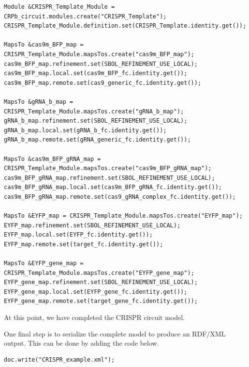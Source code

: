 

\vspace{\abovedisplayskip}
\begin{minipage}{0.95\textwidth}
\begin{lstlisting}
Module &CRISPR_Template_Module = CRPb_circuit.modules.create("CRISPR_Template"); 	
CRISPR_Template_Module.definition.set(CRISPR_Template.identity.get());

MapsTo &cas9m_BFP_map = CRISPR_Template_Module.mapsTos.create("cas9m_BFP_map");
cas9m_BFP_map.refinement.set(SBOL_REFINEMENT_USE_LOCAL);
cas9m_BFP_map.local.set(cas9m_BFP_fc.identity.get());
cas9m_BFP_map.remote.set(cas9_generic_fc.identity.get());

MapsTo &gRNA_b_map = CRISPR_Template_Module.mapsTos.create("gRNA_b_map");
gRNA_b_map.refinement.set(SBOL_REFINEMENT_USE_LOCAL);
gRNA_b_map.local.set(gRNA_b_fc.identity.get());
gRNA_b_map.remote.set(gRNA_generic_fc.identity.get());

MapsTo &cas9m_BFP_gRNA_map = CRISPR_Template_Module.mapsTos.create("cas9m_BFP_gRNA_map");
cas9m_BFP_gRNA_map.refinement.set(SBOL_REFINEMENT_USE_LOCAL);
cas9m_BFP_gRNA_map.local.set(cas9m_BFP_gRNA_fc.identity.get());
cas9m_BFP_gRNA_map.remote.set(cas9_gRNA_complex_fc.identity.get());

MapsTo &EYFP_map = CRISPR_Template_Module.mapsTos.create("EYFP_map");
EYFP_map.refinement.set(SBOL_REFINEMENT_USE_LOCAL);
EYFP_map.local.set(EYFP_fc.identity.get());
EYFP_map.remote.set(target_fc.identity.get());

MapsTo &EYFP_gene_map = CRISPR_Template_Module.mapsTos.create("EYFP_gene_map");
EYFP_gene_map.refinement.set(SBOL_REFINEMENT_USE_LOCAL);
EYFP_gene_map.local.set(EYFP_gene_fc.identity.get());
EYFP_gene_map.remote.set(target_gene_fc.identity.get());
\end{lstlisting}
\end{minipage}

At this point, we have completed the CRISPR circuit model. 

One final step is to serialize the complete model to produce an RDF/XML output. This can be done by adding the code below.

\vspace{\abovedisplayskip}
\begin{minipage}{0.95\textwidth}
\begin{lstlisting}
doc.write("CRISPR_example.xml");
\end{lstlisting}
\end{minipage}